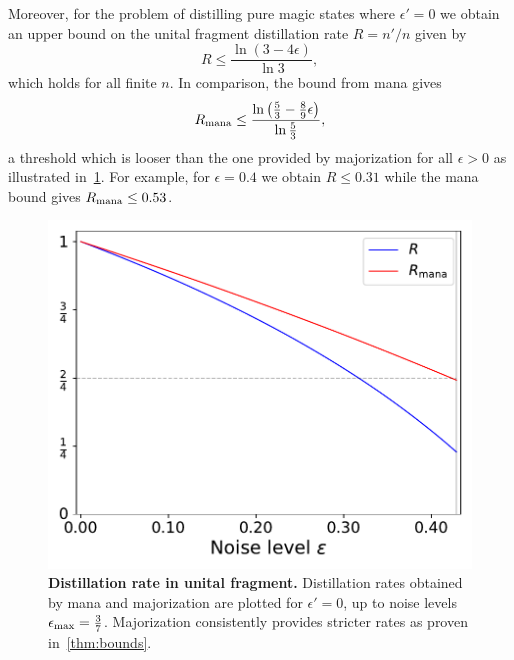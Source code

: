 \documentclass[pra,
aps,
twocolumn,
superscriptaddress,
groupedaddress,
nofootinbib,
reprint
]{revtex4-1}
\begin{document}
Moreover, for the problem of distilling pure magic states where $\epsilon'=0$ we obtain an upper bound on the unital fragment distillation rate $R=n'/n$ given by
\begin{equation}
R \leq \frac{\ln (3-4 \epsilon)}{\ln 3},
\end{equation}
which holds for all finite $n$. 
In comparison, the bound from mana gives 
\begin{equation}
	R_{\rm{mana}} \leq \frac{\ln \left(\frac{5}{3} - \frac{8}{9}\epsilon \right)}{\ln \frac{5}{3}},
\end{equation}
a threshold which is looser than the one provided by majorization for all $\epsilon > 0$ as illustrated in~\cref{fig:distill_bounds}.
For example, for $\epsilon = 0.4$ we obtain $R\le 0.31 $ while the mana bound gives $R_{\rm{mana}} \le 0.53$.
\begin{figure}[h]
    \centering
    \includegraphics[scale=0.5]{figs/distill_bounds.pdf}
    \caption{\textbf{Distillation rate in unital fragment.} Distillation rates obtained by mana and majorization are plotted for $\epsilon' = 0$, up to noise levels $\epsilon_{\rm{max}} = \frac{3}{7}$.
    Majorization consistently provides stricter rates as proven in~\cref{thm:bounds}.
    }
    \label{fig:distill_bounds}
\end{figure}
\end{document}
